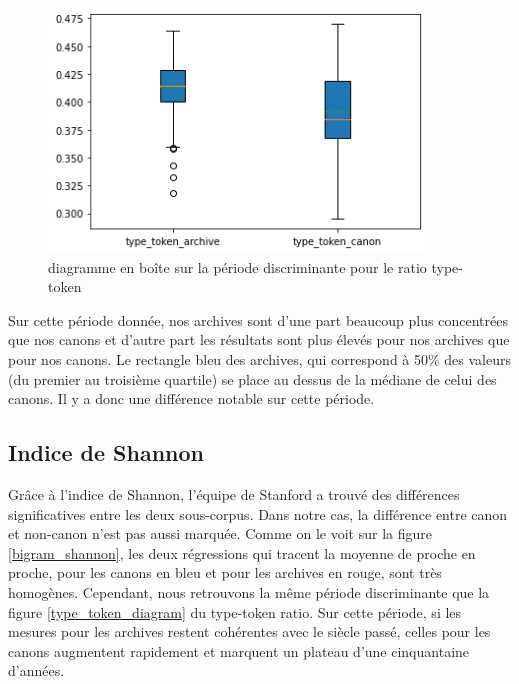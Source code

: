 \documentclass[a4paper,twoside,12pt]{book}
\begin{document}
\bigskip
\begin{figure}[!ht]
    \centering
    \includegraphics[width=10cm]{img/08_boxplot_type_token.png}
    \caption{diagramme en boîte sur la période discriminante pour le ratio type-token}
    \label{boxplot_tt}
\end{figure}

Sur cette période donnée, nos archives sont d'une part beaucoup plus concentrées que nos canons et d'autre part les résultats sont plus élevés pour nos archives que pour nos canons. Le rectangle bleu des archives, qui correspond à 50\% des valeurs (du premier au troisième quartile) se place au dessus de la médiane de celui des canons. Il y a donc une différence notable sur cette période.

\subsection{Indice de Shannon}

Grâce à l'indice de Shannon, l'équipe de Stanford a trouvé des différences significatives entre les deux sous-corpus. Dans notre cas, la différence entre canon et non-canon n'est pas aussi marquée. Comme on le voit sur la figure \ref{bigram_shannon}, les deux régressions qui tracent la moyenne de proche en proche, pour les canons en bleu et pour les archives en rouge, sont très homogènes. Cependant, nous retrouvons la même période discriminante que la figure \ref{type_token_diagram} du type-token ratio. Sur cette période, si les mesures pour les archives restent cohérentes avec le siècle passé, celles pour les canons augmentent rapidement et marquent un plateau d'une cinquantaine d'années. 
\end{document}
